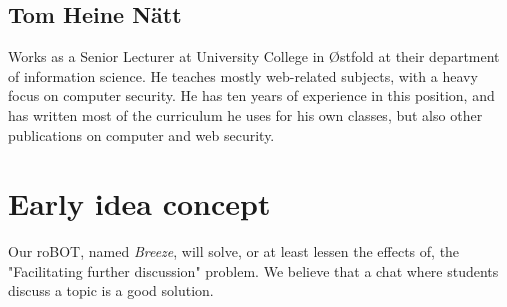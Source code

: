 \documentclass{article}
\begin{document}
\subsection{Tom Heine Nätt} 
Works as a Senior Lecturer at University College in Østfold at their department of information science. He teaches mostly web-related subjects, with a heavy focus on computer security. He has ten years of experience in this position, and has written most of the curriculum he uses for his own classes, but also other publications on computer and web security.

\section{Early idea concept}
Our roBOT, named \textit{Breeze}, will solve, or at least lessen the effects of, the "Facilitating further discussion" problem. We believe that a chat where students discuss a topic is a good solution.
\end{document}
